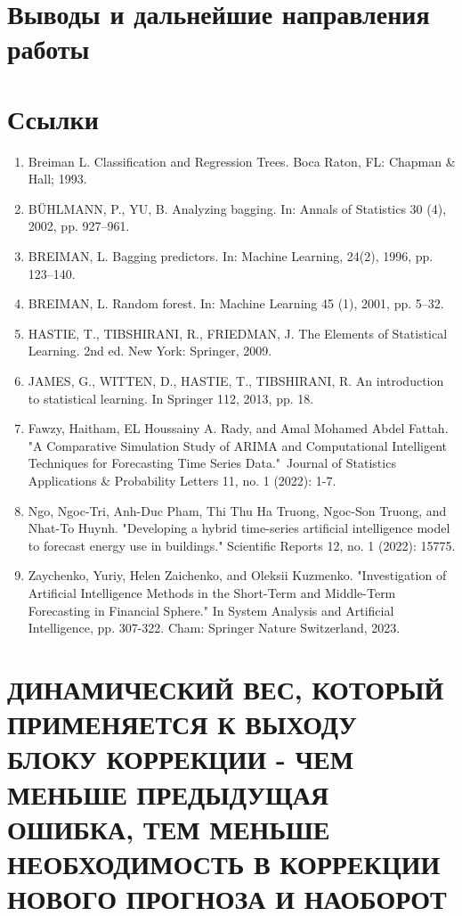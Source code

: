 \documentclass[11pt]{article}
\begin{document}
\section*{Выводы и дальнейшие направления работы}

\section*{Ссылки}

\begin{enumerate}
\item Breiman L. Classification and Regression Trees. Boca Raton, FL: Chapman \& Hall; 1993.
\item BÜHLMANN, P., YU, B. Analyzing bagging. In: Annals of Statistics 30 (4), 2002, pp. 927–961.
\item BREIMAN, L. Bagging predictors. In: Machine Learning, 24(2), 1996, pp. 123–140.
\item BREIMAN, L. Random forest. In: Machine Learning 45 (1), 2001, pp. 5–32.
\item HASTIE, T., TIBSHIRANI, R., FRIEDMAN, J. The Elements of Statistical Learning. 2nd ed. New York: Springer, 2009.
\item JAMES, G., WITTEN, D., HASTIE, T., TIBSHIRANI, R. An introduction to statistical learning. In Springer 112, 2013, pp. 18.
\item Fawzy, Haitham, EL Houssainy A. Rady, and Amal Mohamed Abdel Fattah. "A Comparative Simulation Study of ARIMA and Computational Intelligent Techniques for Forecasting Time Series Data."\ Journal of Statistics Applications \& Probability Letters 11, no. 1 (2022): 1-7.
\item Ngo, Ngoc-Tri, Anh-Duc Pham, Thi Thu Ha Truong, Ngoc-Son Truong, and Nhat-To Huynh. "Developing a hybrid time-series artificial intelligence model to forecast energy use in buildings." Scientific Reports 12, no. 1 (2022): 15775.
\item Zaychenko, Yuriy, Helen Zaichenko, and Oleksii Kuzmenko. "Investigation of Artificial Intelligence Methods in the Short-Term and Middle-Term Forecasting in Financial Sphere." In System Analysis and Artificial Intelligence, pp. 307-322. Cham: Springer Nature Switzerland, 2023.

\end{enumerate}

\section*{ДИНАМИЧЕСКИЙ ВЕС, КОТОРЫЙ ПРИМЕНЯЕТСЯ К ВЫХОДУ БЛОКУ КОРРЕКЦИИ - ЧЕМ МЕНЬШЕ ПРЕДЫДУЩАЯ ОШИБКА, ТЕМ МЕНЬШЕ НЕОБХОДИМОСТЬ В КОРРЕКЦИИ НОВОГО ПРОГНОЗА И НАОБОРОТ}
\end{document}
